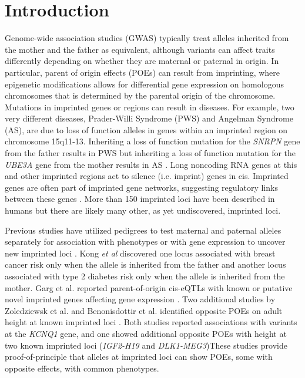 \section{Introduction}\label{ch02-introduction}
Genome-wide association studies (GWAS) typically treat alleles inherited from the mother and the father as equivalent, although variants can affect traits differently depending on whether they are maternal or paternal in origin. In particular, parent of origin effects (POEs) can result from imprinting, where epigenetic modifications allows for differential gene expression on homologous chromosomes that is determined by the parental origin of the chromosome. Mutations in imprinted genes or regions can result in diseases. For example, two very different diseases, Prader-Willi Syndrome (PWS) and Angelman Syndrome (AS), are due to loss of function alleles in genes within an imprinted region on chromosome 15q11-13. Inheriting a loss of function mutation for the \emph{SNRPN} gene from the father results in PWS but inheriting a loss of function mutation for the \emph{UBE3A} gene from the mother results in AS \citep{Peters2014,Falls1999}.  Long noncoding RNA genes at this and other imprinted regions act to silence (i.e. imprint) genes in cis. Imprinted genes are often part of imprinted gene networks, suggesting regulatory links between these genes \cite{Patten:2016cb,Gabory:2009be,Varrault:2006kn}. More than 150 imprinted loci have been described in humans \cite{Benonisdottir:2016dz} but there are likely many other, as yet undiscovered, imprinted loci. 

Previous studies have utilized pedigrees to test maternal and paternal alleles separately for association with phenotypes or with gene expression to uncover new imprinted loci \citep{Kong:2009kk,Baran:2015cx,Garg2012a,Paper2014b,Benonisdottir:2016dz}. Kong \emph{et al} \citep{Kong:2009kk} discovered one locus associated with breast cancer risk only when the allele is inherited from the father and another locus associated with type 2 diabetes risk only when the allele is inherited from the mother. Garg et al. reported parent-of-origin cis-eQTLs with known or putative novel imprinted genes affecting gene expression \citep{Garg2012a}. Two additional studies by Zoledziewsk et al. and Benonisdottir et al. identified opposite POEs on adult height at known imprinted loci \citep{Zoledziewska:2015do,Benonisdottir:2016dz}. Both studies reported associations with variants at the \emph{KCNQ1} gene, and one showed additional opposite POEs with height at two known imprinted loci (\emph{IGF2-H19} and \emph{DLK1-MEG3})\citep{Benonisdottir:2016dz}These studies provide proof-of-principle that alleles at imprinted loci can show POEs, some with opposite effects, with common phenotypes. 


